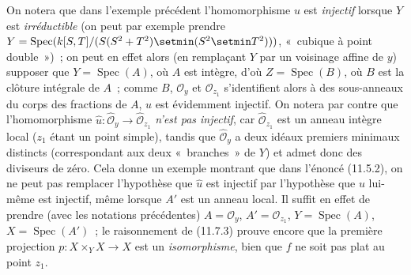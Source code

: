\begin{env}[11.7.4]
\label{IV.11.7.4-fr}
On notera que dans l'exemple précédent l'homomorphisme $u$ est \emph{injectif}
lorsque $Y$ est \emph{irréductible} (on peut par exemple prendre
$Y=\operatorname{Spec}(k[S,T]/(S(S^2+T^2)\setmin(S^2\setmin T^2)))$, «~cubique à point
double~»)~; on peut en effet alors (en remplaçant $Y$ par un voisinage affine de
$y$) supposer que $Y=\operatorname{Spec}(A)$, où $A$ est intègre, d'où
$Z=\operatorname{Spec}(B)$, où $B$ est la clôture intégrale de $A$~; comme $B$,
$\mathcal O_y$ et $\mathcal O_{z_1}$ s'identifient alors à des sous-anneaux du
corps
des fractions de $A$, $u$ est évidemment injectif. On notera par contre que
l'homomorphisme $\widehat u:\widehat{\mathcal O}_y\to
\widehat{\mathcal O}_{z_1}$ \emph{n'est pas injectif}, car
$\widehat{\mathcal O}_{z_1}$ est un anneau intègre local ($z_1$ étant un point
simple), tandis que $\widehat{\mathcal O}_y$ a deux idéaux premiers minimaux
distincts (correspondant aux deux «~branches~» de $Y$) et admet donc des
diviseurs de zéro. Cela donne un exemple montrant que dans l'énoncé (11.5.2), on
ne peut pas remplacer l'hypothèse que $\widehat u$ est injectif par l'hypothèse
que $u$ lui-même est injectif, même lorsque $A'$ est un anneau local. Il suffit
en effet de prendre (avec les notations précédentes) $A=\mathcal O_y$,
$A'=\mathcal O_{z_1}$, $Y=\operatorname{Spec}(A)$,
$X=\operatorname{Spec}(A')$~; le raisonnement de (11.7.3) prouve encore que la
première projection $p:X\times_Y X\to X$ est un \emph{isomorphisme}, bien que $f$ ne
soit pas plat au point $z_1$.
\end{env}

